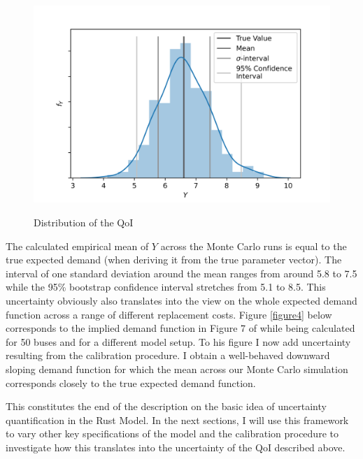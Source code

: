 \begin{figure}[H]
	\caption{Distribution of the QoI}
	\vspace*{-4mm}
	\centering
	\includegraphics[scale=0.9]{../figures/figure_3.png}
	\label{figure3}
\end{figure}

The calculated empirical mean of $Y$ across the Monte Carlo runs is equal to the true expected demand (when deriving it from the true parameter vector). The interval of one standard deviation around the mean ranges from around 5.8 to 7.5 while the 95\% bootstrap confidence interval stretches from 5.1 to 8.5. This uncertainty obviously also translates into the view on the whole expected demand function across a range of different replacement costs. Figure \ref{figure4} below corresponds to the implied demand function in Figure 7 of \cite{Rust.1987} while being calculated for 50 buses and for a different model setup. To his figure I now add uncertainty resulting from the calibration procedure. I obtain a well-behaved downward sloping demand function for which the mean across our Monte Carlo simulation corresponds closely to the true expected demand function.

This constitutes the end of the description on the basic idea of uncertainty quantification in the Rust Model. In the next sections, I will use this framework to vary other key specifications of the model and the calibration procedure to investigate how this translates into the uncertainty of the QoI described above.

